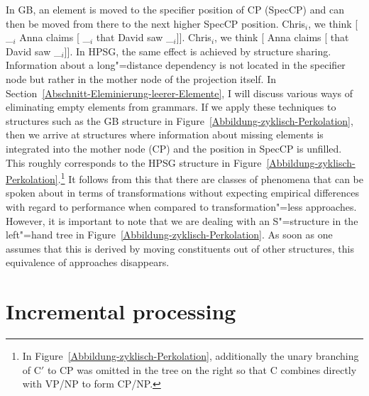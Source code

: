 In GB, an element is moved to the specifier position of CP (SpecCP) and can then be moved from there to the next higher SpecCP position.
\eal\settowidth{}
\ex
Chris$_i$, we think [ \_$_i$ Anna claims [ \_$_i$ that David saw \_$_i$]].
\ex
Chris$_i$, we think [ Anna claims [ that David saw \_$_i$]].
\zl
In HPSG, the same effect is achieved by structure sharing. Information about a long"=distance dependency
is not located in the specifier node but rather in the mother node of the projection itself. In Section~\ref{Abschnitt-Eleminierung-leerer-Elemente},
I will discuss various ways of eliminating empty elements from grammars. If we apply these techniques to structures such as the GB structure
in Figure~\ref{Abbildung-zyklisch-Perkolation}, then we arrive at structures where information about missing elements is integrated into the
mother node (CP) and the position in SpecCP is unfilled. This roughly corresponds to the HPSG structure in Figure~\ref{Abbildung-zyklisch-Perkolation}.\footnote{%
In Figure~\ref{Abbildung-zyklisch-Perkolation}, additionally the unary branching of C$'$ to CP was omitted in the tree on the right so that C combines directly with VP/NP
to form CP/NP.%
}
It follows from this that there are classes of phenomena that
can be spoken about in terms of transformations without expecting empirical differences with regard to
performance when compared to transformation"=less approaches.
However, it is important to note that we are dealing with an S"=structure in the left"=hand tree in Figure~\ref{Abbildung-zyklisch-Perkolation}. As soon as one assumes
that this is derived by moving constituents out of other structures, this equivalence of approaches disappears.

\section{Incremental processing}
\label{Abschnitt-Inkrementelle-Verarbeitung}\label{sec-incremental-processing}


